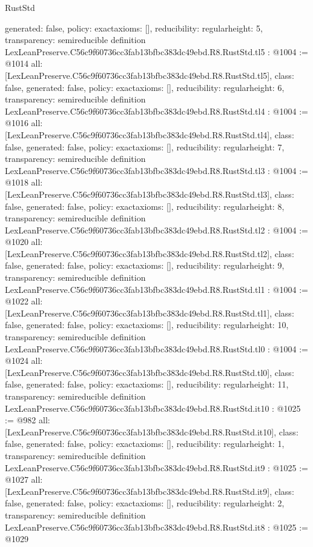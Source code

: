 \begin{lexlean}{RustStd}
\begin{coremodule}
{  generated: false,
  policy: exact{axioms: []},
  reducibility: regular{height: 5},
  transparency: semireducible
}
definition LexLeanPreserve.C56c9f60736cc3fab13bfbc383dc49ebd.R8.RustStd.tl5 : @1004 := @1014 {
  all: [LexLeanPreserve.C56c9f60736cc3fab13bfbc383dc49ebd.R8.RustStd.tl5],
  class: false,
  generated: false,
  policy: exact{axioms: []},
  reducibility: regular{height: 6},
  transparency: semireducible
}
definition LexLeanPreserve.C56c9f60736cc3fab13bfbc383dc49ebd.R8.RustStd.tl4 : @1004 := @1016 {
  all: [LexLeanPreserve.C56c9f60736cc3fab13bfbc383dc49ebd.R8.RustStd.tl4],
  class: false,
  generated: false,
  policy: exact{axioms: []},
  reducibility: regular{height: 7},
  transparency: semireducible
}
definition LexLeanPreserve.C56c9f60736cc3fab13bfbc383dc49ebd.R8.RustStd.tl3 : @1004 := @1018 {
  all: [LexLeanPreserve.C56c9f60736cc3fab13bfbc383dc49ebd.R8.RustStd.tl3],
  class: false,
  generated: false,
  policy: exact{axioms: []},
  reducibility: regular{height: 8},
  transparency: semireducible
}
definition LexLeanPreserve.C56c9f60736cc3fab13bfbc383dc49ebd.R8.RustStd.tl2 : @1004 := @1020 {
  all: [LexLeanPreserve.C56c9f60736cc3fab13bfbc383dc49ebd.R8.RustStd.tl2],
  class: false,
  generated: false,
  policy: exact{axioms: []},
  reducibility: regular{height: 9},
  transparency: semireducible
}
definition LexLeanPreserve.C56c9f60736cc3fab13bfbc383dc49ebd.R8.RustStd.tl1 : @1004 := @1022 {
  all: [LexLeanPreserve.C56c9f60736cc3fab13bfbc383dc49ebd.R8.RustStd.tl1],
  class: false,
  generated: false,
  policy: exact{axioms: []},
  reducibility: regular{height: 10},
  transparency: semireducible
}
definition LexLeanPreserve.C56c9f60736cc3fab13bfbc383dc49ebd.R8.RustStd.tl0 : @1004 := @1024 {
  all: [LexLeanPreserve.C56c9f60736cc3fab13bfbc383dc49ebd.R8.RustStd.tl0],
  class: false,
  generated: false,
  policy: exact{axioms: []},
  reducibility: regular{height: 11},
  transparency: semireducible
}
definition LexLeanPreserve.C56c9f60736cc3fab13bfbc383dc49ebd.R8.RustStd.it10 : @1025 := @982 {
  all: [LexLeanPreserve.C56c9f60736cc3fab13bfbc383dc49ebd.R8.RustStd.it10],
  class: false,
  generated: false,
  policy: exact{axioms: []},
  reducibility: regular{height: 1},
  transparency: semireducible
}
definition LexLeanPreserve.C56c9f60736cc3fab13bfbc383dc49ebd.R8.RustStd.it9 : @1025 := @1027 {
  all: [LexLeanPreserve.C56c9f60736cc3fab13bfbc383dc49ebd.R8.RustStd.it9],
  class: false,
  generated: false,
  policy: exact{axioms: []},
  reducibility: regular{height: 2},
  transparency: semireducible
}
definition LexLeanPreserve.C56c9f60736cc3fab13bfbc383dc49ebd.R8.RustStd.it8 : @1025 := @1029 {
}
\end{coremodule}
\end{lexlean}
